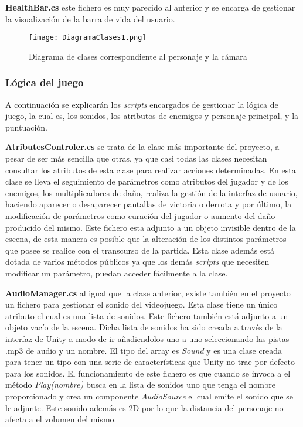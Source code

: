 \textbf{HealthBar.cs} este fichero es muy parecido al anterior y se encarga de gestionar la visualización de la barra de vida del usuario. 

\begin{figure}[H]
    \centering
    \texttt{[image: DiagramaClases1.png]}
    \caption{Diagrama de clases correspondiente al personaje y la cámara}
\end{figure}

\subsubsection{Lógica del juego}

A continuación se explicarán los \textit{scripts} encargados de gestionar la lógica de juego, la cual es, los sonidos, los atributos de enemigos y personaje principal, y la puntuación.

\textbf{AtributesControler.cs} se trata de la clase más importante del proyecto, a pesar de ser más sencilla que otras, ya que casi todas las clases necesitan consultar los atributos de esta clase para realizar acciones determinadas. En esta clase se lleva el seguimiento de parámetros como atributos del jugador y de los enemigos, los multiplicadores de daño, realiza la gestión de la interfaz de usuario, haciendo aparecer o desaparecer pantallas de victoria o derrota y por último, la modificación de parámetros como curación del jugador o aumento del daño producido del mismo. Este fichero esta adjunto a un objeto invisible dentro de la escena, de esta manera es posible que la alteración de los distintos parámetros que posee se realice con el transcurso de la partida. Esta clase además está dotada de varios métodos públicos ya que los demás \textit{scripts} que necesiten modificar un parámetro, puedan acceder fácilmente a la clase.

\textbf{AudioManager.cs} al igual que la clase anterior, existe también en el proyecto un fichero para gestionar el sonido del videojuego. Esta clase tiene un único atributo el cual es una lista de sonidos. Este fichero también está adjunto a un objeto vacío de la escena. Dicha lista de sonidos ha sido creada a través de la interfaz de Unity a modo de ir añadiendolos uno a uno seleccionando las pistas .mp3 de audio y un nombre. El tipo del array es \textit{Sound} y es una clase creada para tener un tipo con una serie de características que Unity no trae por defecto para los sonidos. El funcionamiento de este fichero es que cuando se invoca a el método \textit{Play(nombre)} busca en la lista de sonidos uno que tenga el nombre proporcionado y crea un componente \textit{AudioSource} el cual emite el sonido que se le adjunte. Este sonido además es 2D por lo que la distancia del personaje no afecta a el volumen del mismo.

